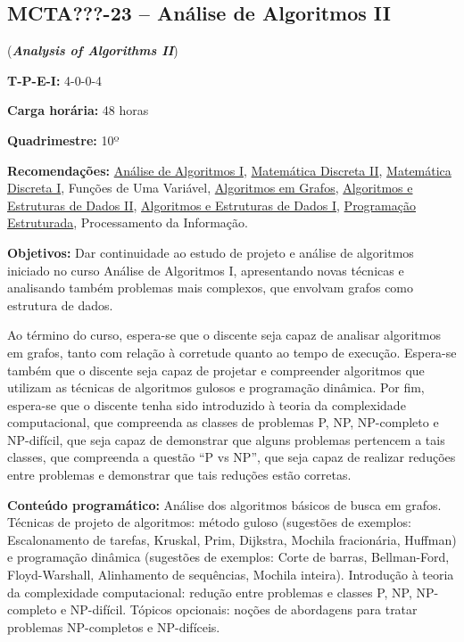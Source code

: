 \documentclass[class=article, crop=false]{standalone}
\begin{document}
\subsection{MCTA???-23 -- Análise de Algoritmos II}
\label{disc:aaII}

(\textbf{\textit{Analysis of Algorithms II}})

\begin{center}
    \begin{minipage}{0.85\textwidth}
        \textbf{T-P-E-I:} 4-0-0-4
        
        \textbf{Carga horária:} 48 horas
        
        \textbf{Quadrimestre:} 10º
        
        \textbf{Recomendações:} 
        \hyperref[disc:aaI]{Análise de Algoritmos I},
        \hyperref[disc:mdII]{Matemática Discreta II},
        \hyperref[disc:mdI]{Matemática Discreta I},
        Funções de Uma Variável,
        \hyperref[disc:ag]{Algoritmos em Grafos},
        \hyperref[disc:aedII]{Algoritmos e Estruturas de Dados II},
        \hyperref[disc:aedI]{Algoritmos e Estruturas de Dados I},
        \hyperref[disc:pe]{Programação Estruturada},
        Processamento da Informação.
    
    \end{minipage}
\end{center}

\textbf{Objetivos:}
Dar continuidade ao estudo de projeto e análise de algoritmos iniciado no curso
Análise de Algoritmos I, apresentando novas técnicas e analisando também
problemas mais complexos, que envolvam grafos como estrutura de dados.

Ao término do curso, espera-se que o discente seja capaz de analisar algoritmos
em grafos, tanto com relação à corretude quanto ao tempo de execução.
Espera-se também que o discente seja capaz de projetar e compreender algoritmos
que utilizam as técnicas de algoritmos gulosos e programação dinâmica. 
Por fim, espera-se que o discente tenha sido introduzido à teoria da
complexidade computacional, que compreenda as classes de problemas P, NP,
NP-completo e NP-difícil, que seja capaz de demonstrar que alguns problemas
pertencem a tais classes, que compreenda a questão ``P vs NP'', que seja capaz
de realizar reduções entre problemas e demonstrar que tais reduções estão
corretas.

\textbf{Conteúdo programático:}
Análise dos algoritmos básicos de busca em grafos.
Técnicas de projeto de algoritmos: método guloso (sugestões de exemplos: Escalonamento
de tarefas, Kruskal, Prim, Dijkstra, Mochila fracionária, Huffman) e programação 
dinâmica (sugestões de exemplos: Corte de barras, Bellman-Ford, Floyd-Warshall, 
Alinhamento de sequências, Mochila inteira).
Introdução à teoria da complexidade computacional: redução entre problemas e 
classes P, NP, NP-completo e NP-difícil.
Tópicos opcionais: noções de abordagens para tratar problemas NP-completos e NP-difíceis.
\end{document}
